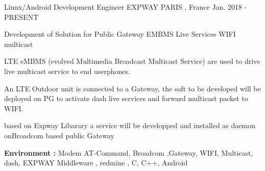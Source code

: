 


\begin{cventries}


\cventry
{Linux/Android Development Engineer } %
{EXPWAY} %
{PARIS , France} %
{Jan. 2018 - PRESENT} %
{ %
\begin{cvitems}
\item {Development of Solution for Public Gateway EMBMS Live Services WIFI multicast}
\item {LTE eMBMS (evolved Multimedia Broadcast Multicast Service) are used to drive live multicast service to end userphones.}
\item { An LTE  Outdoor unit is connected to a Gateway, the soft to be developed will be deployed on PG to activate dash live services and forward multicast packet to WIFI.}
\item {based on Expway Libarary a service will be developped and installed as daemon onBroadcom based public Gateway}
\item { \textbf{Environment :} Modem AT-Command, Broadcom ,Gateway, WIFI, Multicast, dash, EXPWAY Middleware , redmine , C, C++, Android}
\end{cvitems}
}




\end{cventries}

